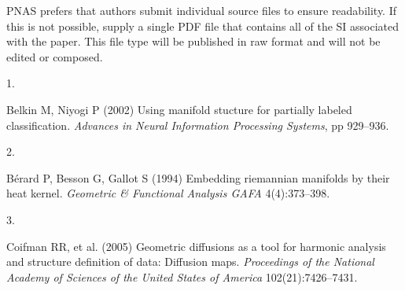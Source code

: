 \documentclass[9pt,twocolumn,twoside,]{pnas-new}
\newlength{\cslhangindent}
\newlength{\csllabelwidth}
\newlength{\cslentryspacingunit} %
\newenvironment{CSLReferences}[2] %
 {%
  \setlength{\parindent}{0pt}
  \ifodd #1
  \let\oldpar\par
  \def\par{\hangindent=\cslhangindent\oldpar}
  \fi
  \setlength{\parskip}{#2\cslentryspacingunit}
 }%
 {}
\newcommand{\CSLLeftMargin}[1]{\parbox[t]{\csllabelwidth}{#1}}
\newcommand{\CSLRightInline}[1]{\parbox[t]{\linewidth - \csllabelwidth}{#1}\break}
\begin{document}
PNAS prefers that authors submit individual source files to ensure
readability. If this is not possible, supply a single PDF file that
contains all of the SI associated with the paper. This file type will be
published in raw format and will not be edited or composed.

\showmatmethods
\showacknow
\pnasbreak

\hypertarget{refs}{}
\begin{CSLReferences}{0}{0}
\leavevmode{}%
\CSLLeftMargin{1. }%
\CSLRightInline{Belkin M, Niyogi P (2002) Using manifold stucture for
partially labeled classification. \emph{Advances in Neural Information
Processing Systems}, pp 929--936.}

\leavevmode{}%
\CSLLeftMargin{2. }%
\CSLRightInline{Bérard P, Besson G, Gallot S (1994) Embedding riemannian
manifolds by their heat kernel. \emph{Geometric \& Functional Analysis
GAFA} 4(4):373--398.}

\leavevmode{}%
\CSLLeftMargin{3. }%
\CSLRightInline{Coifman RR, et al. (2005) Geometric diffusions as a tool
for harmonic analysis and structure definition of data: Diffusion maps.
\emph{Proceedings of the National Academy of Sciences of the United
States of America} 102(21):7426--7431.}

\end{CSLReferences}



% 
\end{document}
